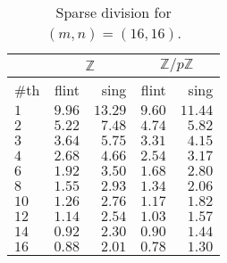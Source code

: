 \documentclass{deliverablereport}
\begin{document}
\begin{table}[htb]
\begin{tabular}{l | r | r | r | r | }
 & \multicolumn{2}{|c|}{$\mathbb{Z}$} & \multicolumn{2}{|c|}{$\mathbb{Z}/p \mathbb{Z}$} \\ \hline
\#th   & flint & sing & flint & sing\\ \hline
$1$   & $9.96$ & $13.29$ &$9.60$ & $11.44$\\ \hline
$2$   & $5.22$ & $7.48$ &$4.74$ & $5.82$\\ \hline
$3$   & $3.64$ & $5.75$  &$3.31$ & $4.15$\\ \hline
$4$   & $2.68$ & $4.66$  &$2.54$ & $3.17$\\ \hline
$6$   & $1.92$ & $3.50$  &$1.68$ & $2.80$\\ \hline
$8$   & $1.55$ & $2.93$  &$1.34$ & $2.06$\\ \hline
$10$  & $1.26$ & $2.76$  &$1.17$ & $1.82$\\ \hline
$12$  & $1.14$ & $2.54$  &$1.03$ & $1.57$\\ \hline
$14$  & $0.92$ & $2.30$  &$0.90$ & $1.44$\\ \hline
$16$  & $0.88$ & $2.01$  &$0.78$ & $1.30$\\ \hline
\end{tabular}
\caption{Sparse division for $(m, n) = (16, 16)$.}
\label{table_sparse_div}
\end{table}
\end{document}
